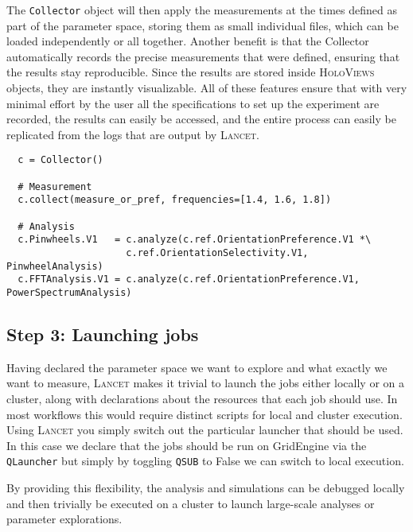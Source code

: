 The \texttt{Collector} object will then apply the measurements at the
times defined as part of the parameter space, storing them as small
individual files, which can be loaded independently or all
together. Another benefit is that the Collector automatically records
the precise measurements that were defined, ensuring that the results
stay reproducible. Since the results are stored inside
\textsc{HoloViews} objects, they are instantly visualizable. All of
these features ensure that with very minimal effort by the user all
the specifications to set up the experiment are recorded, the results
can easily be accessed, and the entire process can easily be
replicated from the logs that are output by \textsc{Lancet}.

\begin{minipage}{\linewidth}
\begin{lstlisting}
  c = Collector()

  # Measurement
  c.collect(measure_or_pref, frequencies=[1.4, 1.6, 1.8])

  # Analysis
  c.Pinwheels.V1   = c.analyze(c.ref.OrientationPreference.V1 *\
                     c.ref.OrientationSelectivity.V1, PinwheelAnalysis)
  c.FFTAnalysis.V1 = c.analyze(c.ref.OrientationPreference.V1, PowerSpectrumAnalysis)
\end{lstlisting}
\end{minipage}

\subsection{Step 3: Launching jobs}

Having declared the parameter space we want to explore and what
exactly we want to measure, \textsc{Lancet} makes it trivial to launch
the jobs either locally or on a cluster, along with declarations about
the resources that each job should use. In most workflows this would
require distinct scripts for local and cluster execution. Using
\textsc{Lancet} you simply switch out the particular launcher that
should be used. In this case we declare that the jobs should be run on
GridEngine via the \texttt{QLauncher} but simply by toggling
\texttt{QSUB} to False we can switch to local execution.

By providing this flexibility, the analysis and simulations can be
debugged locally and then trivially be executed on a cluster to launch
large-scale analyses or parameter explorations.

